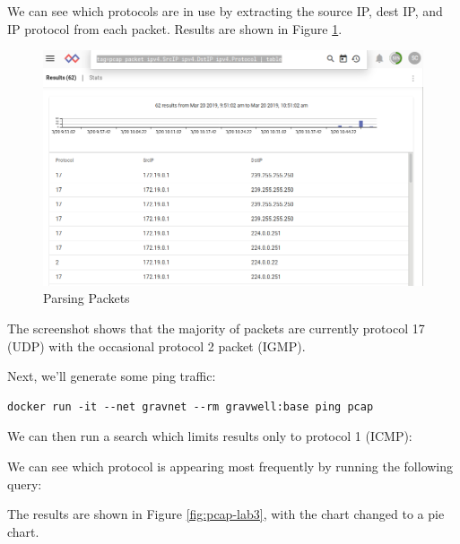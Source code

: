 We can see which protocols are in use by extracting the source IP,
dest IP, and IP protocol from each packet. Results are shown in Figure \ref{fig:pcap-lab2}.



\begin{figure}
	\includegraphics{images/igst-pcap-lab2.png}
	\caption{Parsing Packets}
	\label{fig:pcap-lab2}
\end{figure}

The screenshot shows that the majority of packets are currently
protocol 17 (UDP) with the occasional protocol 2 packet (IGMP).

Next, we'll generate some ping traffic:

\begin{Verbatim}[breaklines=true]
docker run -it --net gravnet --rm gravwell:base ping pcap
\end{Verbatim}

We can then run a search which limits results only to protocol 1
(ICMP):



We can see which protocol is appearing most frequently by running the
following query:


The results are shown in Figure \ref{fig:pcap-lab3}, with the chart changed to a pie chart.

